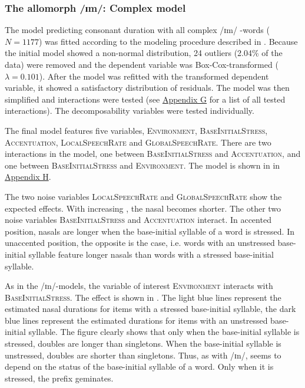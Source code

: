 \subsubsection{The allomorph /ɪm/: Complex model}


The model predicting consonant duration with all complex /ɪm/ -words ($N=1177$) was fitted according to the modeling procedure described in .
Because the initial model showed a non-normal distribution,  24 outliers (2.04\% of the data) were removed and the dependent variable was Box-Cox-transformed ($\lambda = 0.101$).  
After the model was refitted with the transformed dependent variable, it showed a satisfactory distribution of residuals. The model was then simplified and interactions were tested (see \hyperref[Appendix G Summaries of tested interactions in experimental study]{Appendix G} for a list of all tested interactions). 
The decomposability variables were tested individually.



The final model features five variables, \textsc{Environment}, \textsc{BaseInitialStress}, \textsc{Accentuation}, \textsc{LocalSpeechRate} and \textsc{GlobalSpeechRate}. There are two interactions in the model, one between \textsc{BaseInitialStress} and \textsc{Accentuation}, and one between \textsc{BaseInitialStress} and \textsc{Environment}. The model is shown in  in \hyperref[Appendix H: Model Summaries Experiment]{Appendix H}.

The two noise variables \textsc{LocalSpeechRate} and \textsc{GlobalSpeechRate} show the expected effects. With increasing , the nasal becomes shorter.
 The other two noise variables \textsc{BaseInitialStress} and \textsc{Accentuation} interact. In accented position, nasals are longer when the base-initial syllable of a word is stressed. In unaccented position, the opposite is the case, i.e. words with an unstressed base-initial syllable feature longer nasals than words with a stressed base-initial syllable. 
 


As in the /ɪn/-models, the variable of interest \textsc{Environment} interacts with \textsc{BaseInitialStress}. The effect is shown in . 
The light blue lines represent the estimated nasal durations for items with a stressed base-initial syllable, the dark blue lines represent  the estimated durations for items with an unstressed base-initial syllable.
The figure clearly shows that 
 only when the base-initial syllable is stressed, doubles are  longer than singletons. When the base-initial syllable is unstressed, doubles are shorter than singletons. 
Thus, as with /ɪn/,  seems to depend on the  status of the base-initial syllable of a word. Only when it is stressed, the prefix  geminates.

